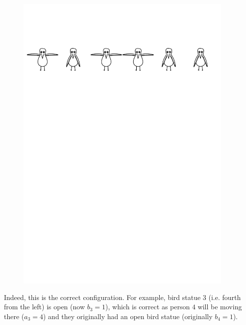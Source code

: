 \begin{figure}[h]
\centering
\includegraphics[width=0.95\textwidth]{s1r2}
\end{figure}

Indeed, this is the correct configuration. For example, bird statue $3$ (i.e. fourth from the left) is open (now $b_3 = 1$),
which is correct as person $4$ will be moving there ($a_3 = 4$) and they originally had an open bird statue (originally $b_4 = 1$).



